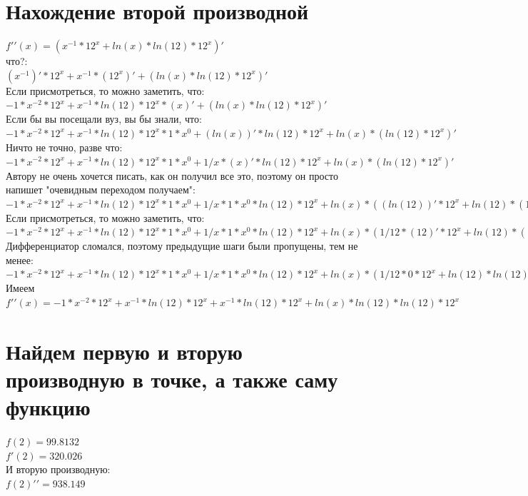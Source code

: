 \documentclass[a4paper]{article}
\begin{document}
\section{Нахождение второй производной}
$f\prime\prime(x) = (x^{-1}*12^{x}+ln(x)*ln(12)*12^{x})\prime$\\ 
что?:\\
$(x^{-1})\prime*12^{x}+x^{-1}*(12^{x})\prime+(ln(x)*ln(12)*12^{x})\prime$\\
Если присмотреться, то можно заметить, что:\\
$-1*x^{-2}*12^{x}+x^{-1}*ln(12)*12^{x}*(x)\prime+(ln(x)*ln(12)*12^{x})\prime$\\
Если бы вы посещали вуз, вы бы знали, что:\\
$-1*x^{-2}*12^{x}+x^{-1}*ln(12)*12^{x}*1*x^{0}+(ln(x))\prime*ln(12)*12^{x}+ln(x)*(ln(12)*12^{x})\prime$\\
Ничто не точно, разве что:\\
$-1*x^{-2}*12^{x}+x^{-1}*ln(12)*12^{x}*1*x^{0}+1/x*(x)\prime*ln(12)*12^{x}+ln(x)*(ln(12)*12^{x})\prime$\\
Автору не очень хочется писать, как он получил все это, поэтому он просто напишет "очевидным переходом получаем":\\
$-1*x^{-2}*12^{x}+x^{-1}*ln(12)*12^{x}*1*x^{0}+1/x*1*x^{0}*ln(12)*12^{x}+ln(x)*((ln(12))\prime*12^{x}+ln(12)*(12^{x})\prime)$\\
Если присмотреться, то можно заметить, что:\\
$-1*x^{-2}*12^{x}+x^{-1}*ln(12)*12^{x}*1*x^{0}+1/x*1*x^{0}*ln(12)*12^{x}+ln(x)*(1/12*(12)\prime*12^{x}+ln(12)*(12^{x})\prime)$\\
Дифференциатор сломался, поэтому предыдущие шаги были пропущены, тем не менее:\\
$-1*x^{-2}*12^{x}+x^{-1}*ln(12)*12^{x}*1*x^{0}+1/x*1*x^{0}*ln(12)*12^{x}+ln(x)*(1/12*0*12^{x}+ln(12)*ln(12)*12^{x}*(x)\prime)$\\
Имеем $f\prime\prime(x) = -1*x^{-2}*12^{x}+x^{-1}*ln(12)*12^{x}+x^{-1}*ln(12)*12^{x}+ln(x)*ln(12)*ln(12)*12^{x}$\\
\section{Найдем первую и вторую производную в точке, а также саму функцию}
$f(2) = 99.8132$\\
$f\prime(2) = 320.026 $\\
И вторую производную: \\ 
$f(2)\prime\prime = 938.149$ \\
\end{document}
